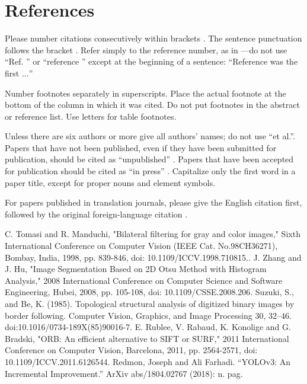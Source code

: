 \documentclass[conference]{IEEEtran}
\begin{document}
\section{References}
Please number citations consecutively within brackets \cite{b1}. The 
sentence punctuation follows the bracket \cite{b2}. Refer simply to the reference 
number, as in \cite{b3}---do not use ``Ref. \cite{b3}'' or ``reference \cite{b3}'' except at 
the beginning of a sentence: ``Reference \cite{b3} was the first $\ldots$''

Number footnotes separately in superscripts. Place the actual footnote at 
the bottom of the column in which it was cited. Do not put footnotes in the 
abstract or reference list. Use letters for table footnotes.

Unless there are six authors or more give all authors' names; do not use 
``et al.''. Papers that have not been published, even if they have been 
submitted for publication, should be cited as ``unpublished'' \cite{b4}. Papers 
that have been accepted for publication should be cited as ``in press'' \cite{b5}. 
Capitalize only the first word in a paper title, except for proper nouns and 
element symbols.

For papers published in translation journals, please give the English 
citation first, followed by the original foreign-language citation \cite{b6}.

\begin{thebibliography}{00}
 C. Tomasi and R. Manduchi, "Bilateral filtering for gray and color images," Sixth International Conference on Computer Vision (IEEE Cat. No.98CH36271), Bombay, India, 1998, pp. 839-846, doi: 10.1109/ICCV.1998.710815..
 J. Zhang and J. Hu, "Image Segmentation Based on 2D Otsu Method with Histogram Analysis," 2008 International Conference on Computer Science and Software Engineering, Hubei, 2008, pp. 105-108, doi: 10.1109/CSSE.2008.206.
Suzuki, S., and Be, K. (1985). Topological structural analysis of digitized binary images by border following. Computer Vision, Graphics, and Image Processing 30, 32–46. doi:10.1016/0734-189X(85)90016-7.
 E. Rublee, V. Rabaud, K. Konolige and G. Bradski, "ORB: An efficient alternative to SIFT or SURF," 2011 International Conference on Computer Vision, Barcelona, 2011, pp. 2564-2571, doi: 10.1109/ICCV.2011.6126544.
Redmon, Joseph and Ali Farhadi. “YOLOv3: An Incremental Improvement.” ArXiv abs/1804.02767 (2018): n. pag.
\end{thebibliography}
\end{document}
